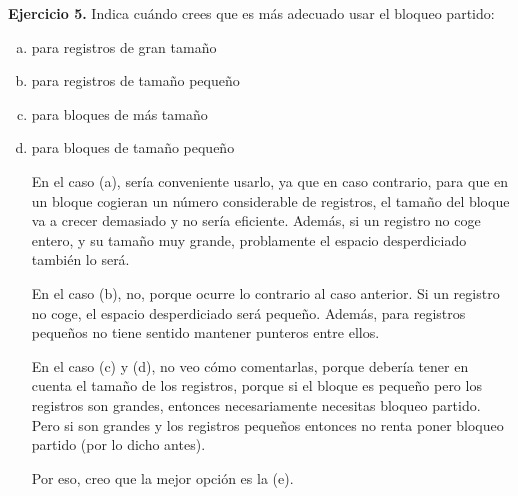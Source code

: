 \documentclass[12pt]{report}
\begin{document}
\textbf{Ejercicio 5.} Indica cuándo crees que es más adecuado usar el bloqueo partido:
\begin{enumerate}[(a)]
\item para registros de gran tamaño

\item para registros de tamaño pequeño

\item para bloques de más tamaño

\item para bloques de tamaño pequeño 

En el caso (a), sería conveniente usarlo, ya que en caso contrario, para que en un bloque cogieran un número considerable de registros, el tamaño del bloque va a crecer demasiado y no sería eficiente. Además, si un registro no coge entero, y su tamaño muy grande, problamente el espacio desperdiciado también lo será.


En el caso (b), no, porque ocurre lo contrario al caso anterior. Si un registro no coge, el espacio desperdiciado será pequeño. Además, para registros pequeños no tiene sentido mantener punteros entre ellos.


En el caso (c) y (d), no veo cómo comentarlas, porque debería tener en cuenta el tamaño de los registros, porque si el bloque es pequeño pero los registros son grandes, entonces necesariamente necesitas bloqueo partido. Pero si son grandes y los registros pequeños entonces no renta poner bloqueo partido (por lo dicho antes).

Por eso, creo que la mejor opción es la (e).

\end{enumerate}
\end{document}
